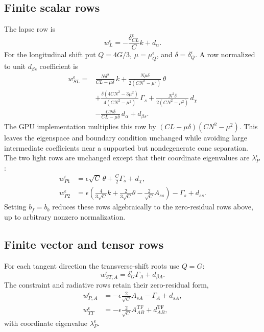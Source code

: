 \documentclass[11pt]{article}
\newcommand{\tf}{\mathrm{TF}}
\begin{document}
\subsection{Finite scalar rows}

The lapse row is
\[
 w_L^\epsilon=-\frac{\delta_{CL}^\epsilon}{C}k+d_\alpha.
\]
For the longitudinal shift put \(Q=4G/3\),
\(\mu=\mu_Q^\epsilon\), and \(\delta=\delta_Q^\epsilon\).  A row normalized
to unit \(d_{\beta s}\) coefficient is
\begin{align}
 w_{SL}^\epsilon={}&
 \frac{N\delta^2}{CL-\mu\delta}\,k
 +\frac{N\mu\delta}{2(CN^2-\mu^2)}\,\theta\\
 &+\frac{\delta(4CN^2-3\mu^2)}
             {4(CN^2-\mu^2)}\,\Gamma_s
 +\frac{N^2\delta}{2(CN^2-\mu^2)}\,d_\chi\\
 &-\frac{CN\delta}{CL-\mu\delta}\,d_\alpha+d_{\beta s}.
\end{align}
The GPU implementation multiplies this row by
\((CL-\mu\delta)(CN^2-\mu^2)\).  This leaves the eigenspace and boundary
condition unchanged while avoiding large intermediate coefficients near a
supported but nondegenerate cone separation.
The two light rows are unchanged except that their coordinate eigenvalues
are \(\lambda_P^\epsilon\):
\begin{align}
 w_{P1}^{\epsilon}
   &=\epsilon\sqrt C\,\theta+\frac C2\Gamma_s+d_\chi,\\
 w_{P2}^{\epsilon}
   &=\epsilon\left(
       \frac{4}{3\sqrt C}k+\frac{2}{3\sqrt C}\theta
       -\frac{2}{\sqrt C}A_{ss}\right)-\Gamma_s+d_{ss}.
\end{align}
Setting \(b_f=b_b\) reduces these rows algebraically to the zero-residual
rows above, up to arbitrary nonzero normalization.

\subsection{Finite vector and tensor rows}

For each tangent direction the transverse-shift roots use \(Q=G\):
\[
 w_{ST,A}^{\epsilon}
 =\delta_G^\epsilon\Gamma_A+d_{\beta A}.
\]
The constraint and radiative rows retain their zero-residual form,
\begin{align}
 w_{P,A}^{\epsilon}
   &=-\epsilon\frac{2}{\sqrt C}A_{sA}-\Gamma_A+d_{sA},\\
 w_{TT}^{\epsilon}
   &=-\epsilon\frac{2}{\sqrt C}A_{AB}^{\tf}+d_{AB}^{\tf},
\end{align}
with coordinate eigenvalue \(\lambda_P^\epsilon\).
\end{document}
